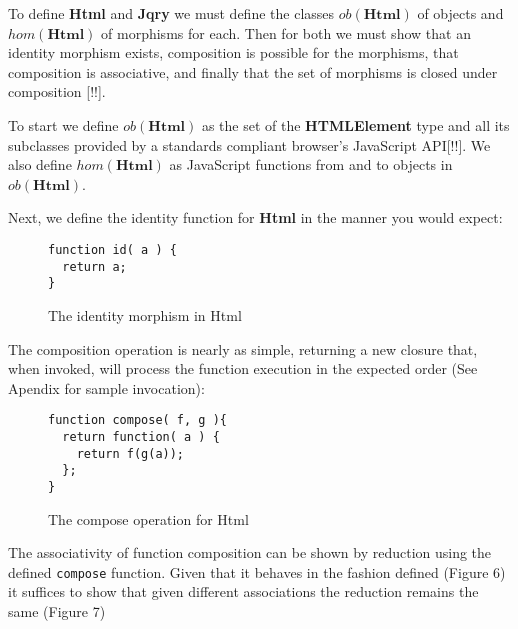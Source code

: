 \documentclass[preprint]{sigplanconf}
\begin{document}
To define \textbf{Html} and \textbf{Jqry} we must define the classes \begin{math}ob(\mathbf{Html})\end{math} of objects and \begin{math}hom(\mathbf{Html})\end{math} of morphisms for each. Then for both we must show that an identity morphism exists, composition is possible for the morphisms, that composition is associative, and finally that the set of morphisms is closed under composition [!!].

To start we define \begin{math}ob(\mathbf{Html})\end{math} as the set of the \textbf{HTMLElement} type and all its subclasses provided by a standards compliant browser's JavaScript API[!!]. We also define \begin{math}hom(\mathbf{Html})\end{math} as JavaScript functions from and to objects in \begin{math}ob(\mathbf{Html})\end{math}.

Next, we define the identity function for \textbf{Html} in the manner you would expect:

\begin{figure}[h!]
\begin{verbatim}
function id( a ) {
  return a;
}
\end{verbatim}
\nocaptionrule \caption{The identity morphism in Html}
\end{figure}

The composition operation is nearly as simple, returning a new closure that, when invoked, will process the function execution in the expected order (See Apendix for sample invocation):

\begin{figure}[h!]
\begin{verbatim}
function compose( f, g ){
  return function( a ) {
    return f(g(a));
  };
}
\end{verbatim}
\nocaptionrule \caption{The compose operation for Html}
\end{figure}

The associativity of function composition can be shown by reduction using the defined \verb|compose| function. Given that it behaves in the fashion defined (Figure 6) it suffices to show that given different associations the reduction remains the same (Figure 7)
\end{document}
